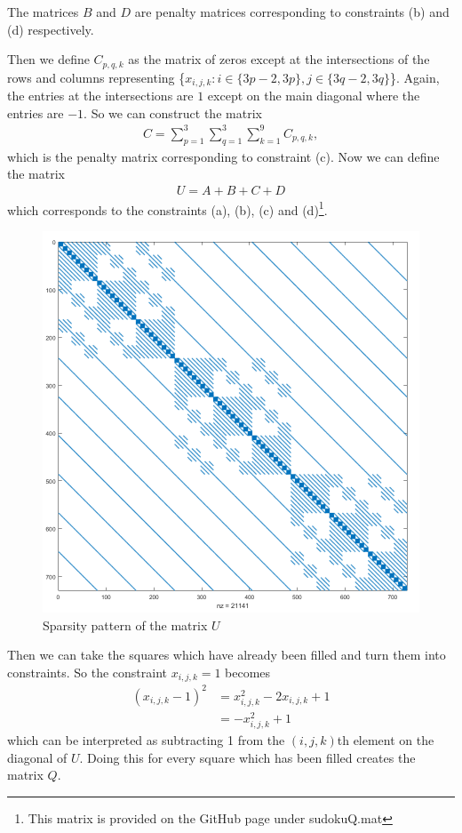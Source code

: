 \documentclass{article}
\begin{document}
\noindent The matrices \(B\) and \(D\) are penalty matrices corresponding to constraints (b) and (d) respectively.

\noindent Then we define \(C_{p,q,k}\) as the matrix of zeros except at the intersections of the rows and columns representing \{\(x_{i,j,k}  :  i \in \{3p-2, 3p\}, j \in \{3q-2, 3q\}\)\}. Again, the entries at the intersections are \(1\) except on the main diagonal where the entries are \(-1\). So we can construct the matrix
\begin{align*}
    C = \sum_{p=1}^3\sum_{q=1}^3\sum_{k=1}^9 C_{p,q,k},
\end{align*}
which is the penalty matrix corresponding to constraint (c). Now we can define the matrix
\begin{align*}
    U = A + B + C + D
\end{align*}
which corresponds to the constraints (a), (b), (c) and (d)\footnote{This matrix is provided on the GitHub page under sudokuQ.mat }.\\

\begin{figure}[H]
    \centering
    \includegraphics[width=0.5\linewidth]{spyQ.png}
    \caption{Sparsity pattern of the matrix \(U\)}
    \label{fig:Usparse}
\end{figure}

\noindent Then we can take the squares which have already been filled and turn them into constraints. So the constraint \(x_{i,j,k} = 1\) becomes 
\begin{align*}
    (x_{i,j,k} - 1)^2 &= x_{i,j,k}^2 - 2x_{i,j,k} + 1 \\
    &= -x_{i,j,k}^2 + 1
\end{align*}
which can be interpreted as subtracting 1 from the \((i,j,k)\)th element on the diagonal of \(U\). Doing this for every square which has been filled creates the matrix \(Q\).\\
\end{document}
